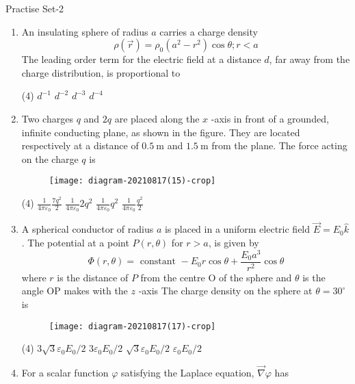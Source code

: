 \newpage
\begin{abox}
	Practise Set-2
\end{abox}
\begin{enumerate}[label=\color{ocre}\textbf{\arabic*.}]
\item An insulating sphere of radius $a$ carries a charge density
$$
\rho(\vec{r})=\rho_{0}\left(a^{2}-r^{2}\right) \cos \theta ; r<a
$$
The leading order term for the electric field at a distance $d$, far away from the charge distribution, is proportional to
{}

\begin{tasks}(4)
\task[\textbf{A.}] $d^{-1}$
\task[\textbf{B.}] $d^{-2}$
\task[\textbf{C.}] $d^{-3}$
\task[\textbf{D.}] $d^{-4}$
\end{tasks}	
\item Two charges $q$ and $2 q$ are placed along the $x$ -axis in front of a grounded, infinite conducting plane, as shown in the figure. They are located respectively at a distance of $0.5 \mathrm{~m}$ and $1.5 \mathrm{~m}$ from the plane. The force acting on the charge $q$ is
{}

\begin{figure}[H]
\centering
\texttt{[image: diagram-20210817(15)-crop]}
\end{figure}
\begin{tasks}(4)
\task[\textbf{A.}] $\frac{1}{4 \pi \varepsilon_{0}} \frac{7 q^{2}}{2}$
\task[\textbf{B.}] $\frac{1}{4 \pi \varepsilon_{0}} 2 q^{2}$
\task[\textbf{C.}] $\frac{1}{4 \pi \varepsilon_{0}} q^{2}$
\task[\textbf{D.}] $\frac{1}{4 \pi \varepsilon_{0}} \frac{q^{2}}{2}$
\end{tasks}
\item A spherical conductor of radius $a$ is placed in a uniform electric field $\vec{E}=E_{0} \hat{k}$. The potential at a point $P(r, \theta)$ for $r>a$, is given by
$$
\Phi(r, \theta)=\text { constant }-E_{0} r \cos \theta+\frac{E_{0} a^{3}}{r^{2}} \cos \theta
$$
where $r$ is the distance of $P$ from the centre $\mathrm{O}$ of the sphere and $\theta$ is the angle OP makes with the $z$ -axis The charge density on the sphere at $\theta=30^{\circ}$ is
{}

\begin{figure}[H]
\centering
\texttt{[image: diagram-20210817(17)-crop]}
\end{figure}
\begin{tasks}(4)
\task[\textbf{A.}] $3 \sqrt{3} \varepsilon_{0} E_{0} / 2$
\task[\textbf{B.}] $3 \varepsilon_{0} E_{0} / 2$
\task[\textbf{C.}] $\sqrt{3} \varepsilon_{0} E_{0} / 2$
\task[\textbf{D.}] $\varepsilon_{0} E_{0} / 2$
\end{tasks}
	\item For a scalar function $\varphi$ satisfying the Laplace equation, $\vec{\nabla} \varphi$ has
{}


\end{enumerate}
